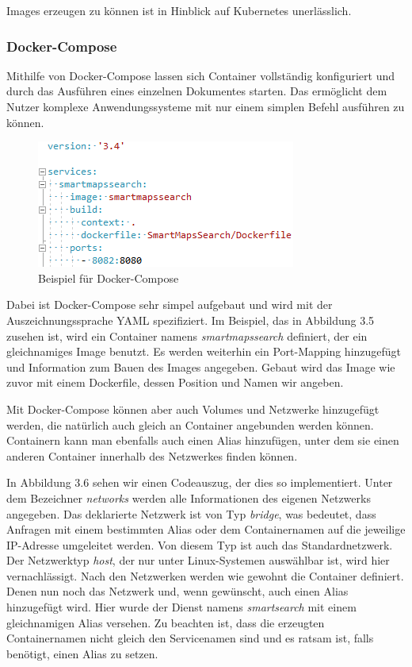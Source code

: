 \documentclass[12pt,a4paper]{scrartcl}
\begin{document}
Images erzeugen zu können ist in Hinblick auf Kubernetes unerlässlich.

\subsubsection{Docker-Compose}

Mithilfe von Docker-Compose lassen sich Container vollständig konfiguriert und durch das Ausführen eines einzelnen Dokumentes starten. Das ermöglicht dem Nutzer komplexe Anwendungssysteme mit nur einem simplen Befehl ausführen zu können. 

\begin{figure}[h!]
	\centering
	\includegraphics[scale=1]{DockerComposeMin.png}
	\caption[Screenshot]{Beispiel für Docker-Compose}
\end{figure}

Dabei ist Docker-Compose sehr simpel aufgebaut und wird mit der Auszeichnungssprache YAML spezifiziert. Im Beispiel, das in Abbildung 3.5 zusehen ist, wird ein Container namens \emph{smartmapssearch} definiert, der ein gleichnamiges Image benutzt. Es werden weiterhin ein Port-Mapping hinzugefügt und Information zum Bauen des Images angegeben. Gebaut wird das Image wie zuvor mit einem Dockerfile, dessen Position und Namen wir angeben. 

Mit Docker-Compose können aber auch Volumes und Netzwerke hinzugefügt werden, die natürlich auch gleich an Container angebunden werden können.
Containern kann man ebenfalls auch einen Alias hinzufügen, unter dem sie einen anderen Container innerhalb des Netzwerkes finden können. 

In Abbildung 3.6 sehen wir einen Codeauszug, der dies so implementiert. Unter dem Bezeichner \emph{networks} werden alle Informationen des eigenen Netzwerks angegeben. Das deklarierte Netzwerk ist von Typ \emph{bridge}, was bedeutet, dass Anfragen mit einem bestimmten Alias oder dem Containernamen auf die jeweilige IP-Adresse umgeleitet werden. Von diesem Typ ist auch das Standardnetzwerk. Der Netzwerktyp \emph{host}, der nur unter Linux-Systemen auswählbar ist, wird hier vernachlässigt. Nach den Netzwerken werden wie gewohnt die Container definiert. Denen nun noch das Netzwerk und, wenn gewünscht, auch einen Alias hinzugefügt wird. Hier wurde der Dienst namens \emph{smartsearch} mit einem gleichnamigen Alias versehen. Zu beachten ist, dass die erzeugten Containernamen nicht gleich den Servicenamen sind und es ratsam ist, falls benötigt, einen Alias zu setzen.
\end{document}
